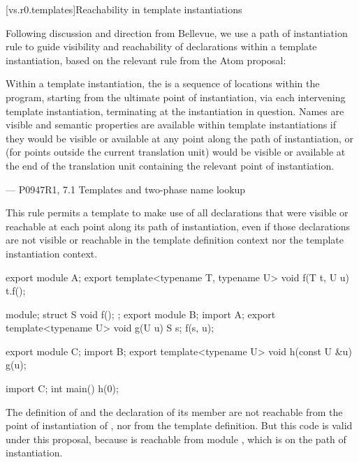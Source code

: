 [vs.r0.templates]{Reachability in template instantiations}

\pnum
Following discussion and direction from Bellevue,
we use a path of instantiation rule to guide
visibility and reachability of declarations
within a template instantiation, based on
the relevant rule from the Atom proposal:

\hfill\begin{minipage}{\dimexpr\textwidth-1cm}
Within a template instantiation, the 
is a sequence of locations within the program,
starting from the ultimate point of instantiation,
via each intervening template instantiation,
terminating at the instantiation in question.
Names are visible and semantic properties are available
within template instantiations
if they would be visible or available
at any point along the path of instantiation,
or (for points outside the current translation unit)
would be visible or available
at the end of the translation unit
containing the relevant point of instantiation.
\begin{flushright}
--- P0947R1, 7.1 Templates and two-phase name lookup
\end{flushright}
\end{minipage}

This rule permits a template to make use of all declarations
that were visible or reachable at each point along its path of instantiation,
even if those declarations are not visible or reachable
in the template definition context nor the template instantiation context.

\pnum
\begin{example}
\begin{codeblock}
export module A;
export template<typename T, typename U> void f(T t, U u) {
  t.f();
}
\end{codeblock}

\begin{codeblock}
module;
struct S { void f(); };
export module B;
import A;
export template<typename U> void g(U u) { S s; f(s, u); }
\end{codeblock}

\begin{codeblock}
export module C;
import B;
export template<typename U> void h(const U &u) { g(u); }
\end{codeblock}

\begin{codeblock}
import C;
int main() { h(0); }
\end{codeblock}

The definition of  and
the declaration of its member 
are not reachable from the point of instantiation
of , nor from the template definition.
But this code is valid under this proposal, because
 is reachable from module , which
is on the path of instantiation.
\end{example}

